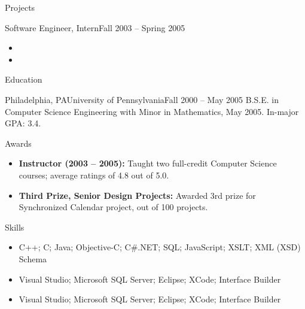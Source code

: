 \documentclass[]{Sohaib-Mohamed}
\begin{document}
\begin{cvsection}{Projects}
\begin{cvsubsection}{Software Engineer, Intern}{}{Fall 2003 -- Spring 2005}
\begin{itemize}
         \item
         \item
      \end{itemize}
   \end{cvsubsection}
\end{cvsection}

\begin{cvsection}{Education}
   \begin{cvsubsection}{Philadelphia, PA}{University of Pennsylvania}{Fall 2000 -- May 2005}
      B.S.E. in Computer Science Engineering with Minor in Mathematics, May 2005.  In-major GPA: 3.4.
   \end{cvsubsection}
\end{cvsection}

\begin{cvsection}{Awards}
   \begin{cvsubsection}{}{}{}
      \begin{itemize}
         \item \textbf{Instructor (2003 – 2005):} Taught two full-credit Computer Science courses; average ratings of 4.8 out of 5.0.
         \item \textbf{Third Prize, Senior Design Projects:} Awarded 3rd prize for Synchronized Calendar project, out of 100 projects.
      \end{itemize}
   \end{cvsubsection}
\end{cvsection}

\begin{cvsection}{Skills}
   \begin{cvsubsection}{}{}{}
      \begin{itemize}
         \item C++; C; Java; Objective-C; C\#.NET; SQL; JavaScript; XSLT; XML (XSD) Schema
         \item Visual Studio; Microsoft SQL Server; Eclipse; XCode; Interface Builder
         \item Visual Studio; Microsoft SQL Server; Eclipse; XCode; Interface Builder
      \end{itemize}
   \end{cvsubsection}
\end{cvsection}
\end{document}
